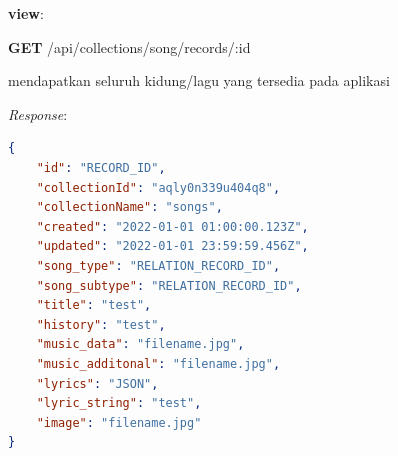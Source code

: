 \textbf{view}:

\textbf{GET} /api/collections/song/records/:id

\indent mendapatkan seluruh kidung/lagu yang tersedia pada aplikasi

\textit{Response}:
\begin{lstlisting}[language=json,firstnumber=1]
{
    "id": "RECORD_ID",
    "collectionId": "aqly0n339u404q8",
    "collectionName": "songs",
    "created": "2022-01-01 01:00:00.123Z",
    "updated": "2022-01-01 23:59:59.456Z",
    "song_type": "RELATION_RECORD_ID",
    "song_subtype": "RELATION_RECORD_ID",
    "title": "test",
    "history": "test",
    "music_data": "filename.jpg",
    "music_additonal": "filename.jpg",
    "lyrics": "JSON",
    "lyric_string": "test",
    "image": "filename.jpg"
}
\end{lstlisting}